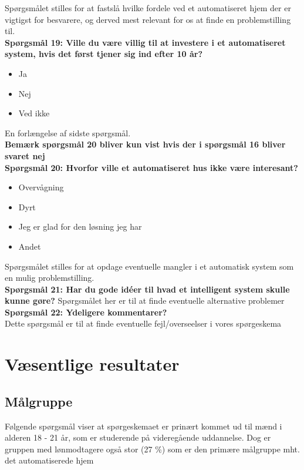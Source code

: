 Spørgsmålet stilles for at fastslå hvilke fordele ved et automatiseret hjem der er vigtigst for besvarere, og derved mest relevant for os at finde en problemstilling til.\\

{\bf{Spørgsmål 19: Ville du være villig til at investere i et automatiseret system, hvis det først tjener sig ind efter 10 år?}}
\begin{itemize}
    \item Ja
    \item Nej
    \item Ved ikke
\end{itemize}

En forlængelse af sidste spørgsmål.\\
{\bf{Bemærk spørgsmål 20 bliver kun vist hvis der i spørgsmål 16 bliver svaret nej}}\\
{\bf{Spørgsmål 20: Hvorfor ville et automatiseret hus ikke være interesant?}}
\begin{itemize}
    \item Overvågning
    \item Dyrt
    \item Jeg er glad for den løsning jeg har
    \item Andet
\end{itemize}

Spørgsmålet stilles for at opdage eventuelle mangler i et automatisk system som en mulig problemstilling.\\
{\bf{Spørgsmål 21: Har du gode idéer til hvad et intelligent system skulle kunne gøre?}}
Spørgsmålet her er til at finde eventuelle alternative problemer\\

{\bf{Spørgsmål 22: Ydeligere kommentarer?}}\\
Dette spørgsmål er til at finde eventuelle fejl/overseelser i vores spørgeskema

\section*{Væsentlige resultater}
\subsection*{Målgruppe}
Følgende spørgsmål viser at spørgeskemaet er prinært kommet ud til mænd i alderen 18 - 21 år, som er studerende på videregående uddannelse. Dog er gruppen med lønmodtagere også stor (27 \%) som er den primære målgruppe mht. det automatiserede hjem\\
\clearpage
